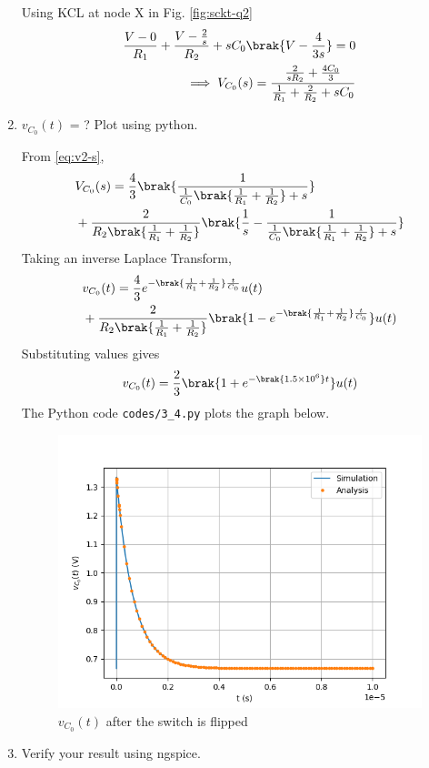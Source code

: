 \documentclass[journal,12pt,twocolumn]{IEEEtran}
\renewcommand\thesection{\arabic{section}}
\begin{document}
\begin{enumerate}[label=\arabic*.,ref=\thesection.\theenumi]
\solution Using KCL at node X in Fig. \ref{fig:sckt-q2}
\begin{align}
    \frac{V - 0}{R_1} + \frac{V - \frac{2}{s}}{R_2} + sC_0\brak{V - \frac{4}{3s}} = 0 \\
\implies V_{C_0}(s) = \frac{\frac{2}{sR_2} + \frac{4C_0}{3}}{\frac{1}{R_1} + \frac{2}{R_2} + sC_0}
\label{eq:v2-s}
\end{align}
\item $v_{C_0}(t)$ = ? Plot using python.

\solution From \eqref{eq:v2-s},
\begin{align}
    &V_{C_0}(s) = \frac{4}{3}\brak{\frac{1}{\frac{1}{C_0}\brak{\frac{1}{R_1} + \frac{1}{R_2}}+s}} \nonumber \\
    &+ \frac{2}{R_2\brak{\frac{1}{R_1} +\frac{1}{R_2}}}\brak{\frac{1}{s} - \frac{1}{\frac{1}{C_0}\brak{\frac{1}{R_1} + \frac{1}{R_2}} + s}}
\end{align}
Taking an inverse Laplace Transform,
\begin{align}
    &v_{C_0}(t) = \frac{4}{3}e^{-\brak{\frac{1}{R_1} + \frac{1}{R_2}}\frac{t}{C_0}}u(t) \nonumber \\ 
    &+ \frac{2}{R_2\brak{\frac{1}{R_1}+\frac{1}{R_2}}}\brak{1 - e^{-\brak{\frac{1}{R_1} + \frac{1}{R_2}}\frac{t}{C_0}}}u(t)
\end{align}
Substituting values gives
\begin{align}
    v_{C_0}(t) = \frac{2}{3}\brak{1 +e^{-\brak{1.5 \times 10^6}t}}u(t)
    \label{eq:v2-t}
\end{align}
The Python code \texttt{codes/3\_4.py} plots the graph below.
\begin{figure}[!htb]
    \includegraphics[width=\columnwidth]{figs/3_4.png}
    \caption{$v_{C_0}(t)$ after the switch is flipped}
    \label{fig:v2-t}
\end{figure}
\item Verify your result using ngspice.


\end{enumerate}
\end{document}
